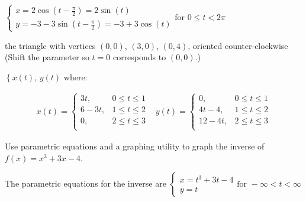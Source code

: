 \documentclass{ximera}
\begin{document}
\begin{question}
\begin{problem}
\begin{solution}
${ \left\{ \begin{array}{l} x = 2\cos\left(t-\frac{\pi}{2}\right) = 2\sin(t) \\ y = -3 - 3\sin\left(t-\frac{\pi}{2}\right) =  -3+3\cos(t) \end{array} \right. \text{for } 0 \leq t <  2\pi}$

\end{solution}
\end{problem}

\begin{problem} \label{findparamlast}
the triangle with vertices $(0,0)$, $(3,0)$, $(0,4)$, oriented counter-clockwise  (Shift the parameter so $t=0$ corresponds to $(0,0)$.) 

\begin{solution}
 $\left\{ x(t), \, y(t) \right.$ where:

\[ \begin{array}{cc}

x(t) = \left\{ \begin{array}{rr}  3t,& 0 \leq t \leq 1 \\
																	6-3t, & 1 \leq t \leq 2 \\
																	0, & 2 \leq t \leq 3 \\ \end{array} \right.
&

y(t) = \left\{ \begin{array}{rr}  0,& 0 \leq t \leq 1 \\
																	4t-4, & 1 \leq t \leq 2 \\
																	12-4t, & 2 \leq t \leq 3 \\ \end{array} \right.



\end{array}\]


\end{solution}
\end{problem}

\end{question}

\begin{problem}
 Use parametric equations and a graphing utility to graph the inverse of $f(x) = x^{3} + 3x - 4$.

 \begin{solution}
The parametric equations for the inverse are ${ \left\{ \begin{array}{l} x = t^3+3t-4 \\ y = t  \end{array} \right. \text{for } -\infty < t < \infty}$
 \end{solution}
 \end{problem}
\end{document}
